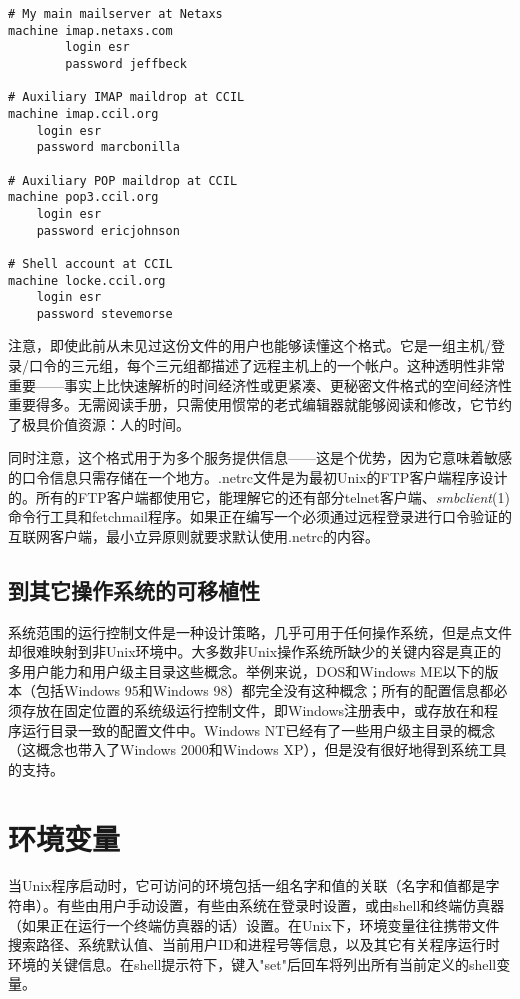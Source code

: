 \documentclass[12pt,oneside]{ctexbook}
\begin{document}
\begin{common-format}
\begin{Verbatim}[label=例10.1 .netrc例子]
# My main mailserver at Netaxs
machine imap.netaxs.com
        login esr
        password jeffbeck

# Auxiliary IMAP maildrop at CCIL
machine imap.ccil.org
    login esr
    password marcbonilla

# Auxiliary POP maildrop at CCIL
machine pop3.ccil.org
    login esr
    password ericjohnson

# Shell account at CCIL
machine locke.ccil.org
    login esr
    password stevemorse
\end{Verbatim}

注意，即使此前从未见过这份文件的用户也能够读懂这个格式。它是一组主机/登录/口令的三元组，每个三元组都描述了远程主机上的一个帐户。这种透明性非常重要——事实上比快速解析的时间经济性或更紧凑、更秘密文件格式的空间经济性重要得多。无需阅读手册，只需使用惯常的老式编辑器就能够阅读和修改，它节约了极具价值资源：人的时间。

同时注意，这个格式用于为多个服务提供信息——这是个优势，因为它意味着敏感的口令信息只需存储在一个地方。.netrc文件是为最初Unix的FTP客户端程序设计的。所有的FTP客户端都使用它，能理解它的还有部分telnet客户端、\textit{smbclient}(1)命令行工具和fetchmail程序。如果正在编写一个必须通过远程登录进行口令验证的互联网客户端，最小立异原则就要求默认使用.netrc的内容。


\subsection{到其它操作系统的可移植性}
系统范围的运行控制文件是一种设计策略，几乎可用于任何操作系统，但是点文件却很难映射到非Unix环境中。大多数非Unix操作系统所缺少的关键内容是真正的多用户能力和用户级主目录这些概念。举例来说，DOS和Windows ME以下的版本（包括Windows 95和Windows 98）都完全没有这种概念；所有的配置信息都必须存放在固定位置的系统级运行控制文件，即Windows注册表中，或存放在和程序运行目录一致的配置文件中。Windows NT已经有了一些用户级主目录的概念（这概念也带入了Windows 2000和Windows XP），但是没有很好地得到系统工具的支持。


\section{环境变量}
当Unix程序启动时，它可访问的环境包括一组名字和值的关联（名字和值都是字符串）。有些由用户手动设置，有些由系统在登录时设置，或由shell和终端仿真器（如果正在运行一个终端仿真器的话）设置。在Unix下，环境变量往往携带文件搜索路径、系统默认值、当前用户ID和进程号等信息，以及其它有关程序运行时环境的关键信息。在shell提示符下，键入"set"后回车将列出所有当前定义的shell变量。


\end{common-format}
\end{document}
